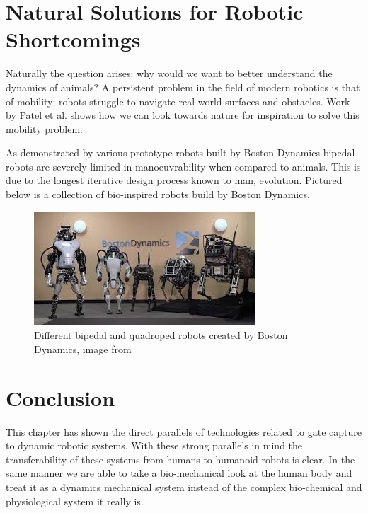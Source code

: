 
\section{Natural Solutions for Robotic Shortcomings}
Naturally the question arises:  why would we want to better understand the dynamics of animals? A persistent problem in the field of modern robotics is that of mobility; robots struggle to navigate real world surfaces and obstacles. Work by Patel et al. \cite{patel2013rapid} shows how we can look towards nature for inspiration to solve this mobility problem. 

As demonstrated by various prototype robots built by Boston Dynamics bipedal robots are severely limited in manoeuvrability when compared to animals. This is due to the longest iterative design process known to man, evolution. Pictured below is a collection of bio-inspired robots build by Boston Dynamics.

\begin{figure}[!ht] 
\captionsetup{width=0.75\linewidth, font=small}  
\includegraphics[width=0.75\linewidth]{figures/boston.jpg}
\caption{Different bipedal and quadroped robots created by Boston Dynamics, image from \cite{bostondynamics}}
\label{fig:boston}
\end{figure}  


\section{Conclusion}
This chapter has shown the direct parallels of technologies related to gate capture to dynamic robotic systems. With these strong parallels in mind the transferability of these systems from humans to humanoid robots is clear. In the same manner we are able to take a bio-mechanical look at the human body and treat it as a dynamics mechanical system instead of the complex bio-chemical and physiological system it really is.

